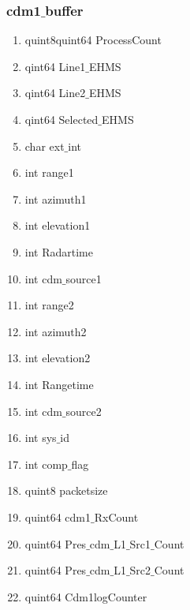 \begin{enumerate}
\subsubsection{cdm1$\_$buffer}
\begin{enumerate}
	\item quint8quint64 ProcessCount
\item qint64 Line1$\_$EHMS
\item qint64 Line2$\_$EHMS
\item qint64 Selected$\_$EHMS
\item char ext$\_$int
\item int range1
\item int azimuth1
\item int elevation1
\item int Radartime
\item int cdm$\_$source1
\item int range2
\item int azimuth2
\item int elevation2
\item int Rangetime
\item int cdm$\_$source2
\item int sys$\_$id
\item int comp$\_$flag
\item quint8 packetsize
\item quint64 cdm1$\_$RxCount
\item quint64 Pres$\_$cdm$\_$L1$\_$Src1$\_$Count
\item quint64 Pres$\_$cdm$\_$L1$\_$Src2$\_$Count
\item quint64 Cdm1logCounter
\end{enumerate}


\end{enumerate}
